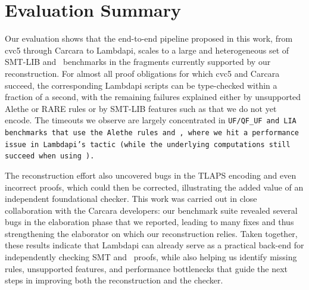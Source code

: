 \section{Evaluation Summary}

Our evaluation shows that the end-to-end pipeline proposed in this work, from cvc5 through Carcara to Lambdapi, scales to a large and heterogeneous set of SMT-LIB and \tlaplus\ benchmarks in the fragments currently supported by our reconstruction.
For almost all proof obligations for which cvc5 and Carcara succeed, the corresponding Lambdapi scripts can be type-checked within a fraction of a second, with the remaining failures explained either by unsupported Alethe or RARE rules or by SMT-LIB features such as  that we do not yet encode.
The timeouts we observe are largely concentrated in \tt{UF}/\tt{QF\_UF} and \tt{LIA} benchmarks that use the Alethe rules  and , where we hit a performance issue in Lambdapi’s  tactic (while the underlying computations still succeed when using ).

The reconstruction effort also uncovered bugs in the TLAPS encoding and even incorrect proofs, which could then be corrected, illustrating the added value of an independent foundational checker.
This work was carried out in close collaboration with the Carcara developers: our benchmark suite revealed several bugs in the elaboration phase that we reported, leading to many fixes and thus strengthening the elaborator on which our reconstruction relies.
Taken together, these results indicate that Lambdapi can already serve as a practical back-end for independently checking SMT and \tlaplus\ proofs, while also helping us identify missing rules, unsupported features, and performance bottlenecks that guide the next steps in improving both the reconstruction and the checker.